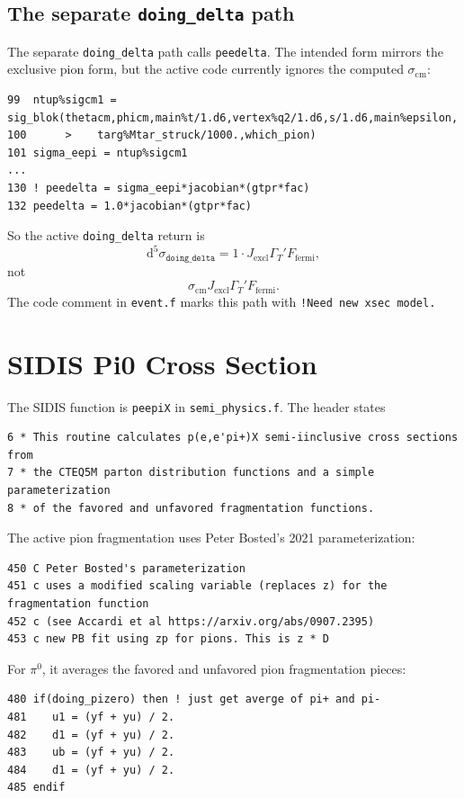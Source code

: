 \documentclass[11pt]{article}
\newcommand{\dd}{\mathrm{d}}
\begin{document}
\subsection{The separate \texttt{doing\_delta} path}

The separate \texttt{doing\_delta} path calls \texttt{peedelta}.  The intended
form mirrors the exclusive pion form, but the active code currently ignores the
computed \(\sigma_{\mathrm{cm}}\):
\begin{lstlisting}
99  ntup%sigcm1 = sig_blok(thetacm,phicm,main%t/1.d6,vertex%q2/1.d6,s/1.d6,main%epsilon,
100      >    targ%Mtar_struck/1000.,which_pion)
101 sigma_eepi = ntup%sigcm1
...
130 ! peedelta = sigma_eepi*jacobian*(gtpr*fac)
132 peedelta = 1.0*jacobian*(gtpr*fac)
\end{lstlisting}
So the active \texttt{doing\_delta} return is
\[
  \dd^5\sigma_{\texttt{doing\_delta}}
  =
  1\cdot J_{\mathrm{excl}}\Gamma_T'F_{\mathrm{fermi}},
\]
not
\[
  \sigma_{\mathrm{cm}}J_{\mathrm{excl}}\Gamma_T'F_{\mathrm{fermi}}.
\]
The code comment in \texttt{event.f} marks this path with
\texttt{!Need new xsec model.}

\section{SIDIS Pi0 Cross Section}

The SIDIS function is \texttt{peepiX} in \texttt{semi\_physics.f}.  The header
states
\begin{lstlisting}
6 * This routine calculates p(e,e'pi+)X semi-iinclusive cross sections from
7 * the CTEQ5M parton distribution functions and a simple parameterization
8 * of the favored and unfavored fragmentation functions.
\end{lstlisting}

The active pion fragmentation uses Peter Bosted's 2021 parameterization:
\begin{lstlisting}
450 C Peter Bosted's parameterization
451 c uses a modified scaling variable (replaces z) for the fragmentation function
452 c (see Accardi et al https://arxiv.org/abs/0907.2395)
453 c new PB fit using zp for pions. This is z * D
\end{lstlisting}
For \(\pi^0\), it averages the favored and unfavored pion fragmentation pieces:
\begin{lstlisting}
480 if(doing_pizero) then ! just get averge of pi+ and pi-
481    u1 = (yf + yu) / 2.
482    d1 = (yf + yu) / 2.
483    ub = (yf + yu) / 2.
484    d1 = (yf + yu) / 2.
485 endif
\end{lstlisting}
\end{document}
